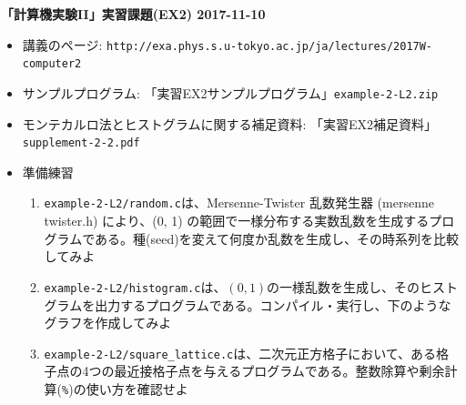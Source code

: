 \documentclass[11pt]{jarticle}
\begin{document}
\noindent
{\bf\large 「計算機実験II」実習課題(EX2) 2017-11-10}
\\[-0.5em]

\noindent
\begin{itemize}
\item 講義のページ: \verb+http://exa.phys.s.u-tokyo.ac.jp/ja/lectures/2017W-computer2+

\item サンプルプログラム: 「実習EX2サンプルプログラム」{\tt example-2-L2.zip}

\item モンテカルロ法とヒストグラムに関する補足資料: 「実習EX2補足資料」{\tt supplement-2-2.pdf}

\item 準備練習
  
\begin{enumerate}
\item {\tt example-2-L2/random.c}は、Mersenne-Twister 乱数発生器 (mersenne twister.h) により、(0, 1) の範囲で一様分布する実数乱数を生成するプログラムである。種(seed)を変えて何度か乱数を生成し、その時系列を比較してみよ
\item {\tt example-2-L2/histogram.c}は、$(0,1)$の一様乱数を生成し、そのヒストグラムを出力するプログラムである。コンパイル・実行し、下のようなグラフを作成してみよ
  \begin{center}
  \end{center}
\item {\tt example-2-L2/square\_lattice.c}は、二次元正方格子において、ある格子点の4つの最近接格子点を与えるプログラムである。整数除算や剰余計算({\tt \%})の使い方を確認せよ
\end{enumerate}


\end{itemize}
\end{document}
